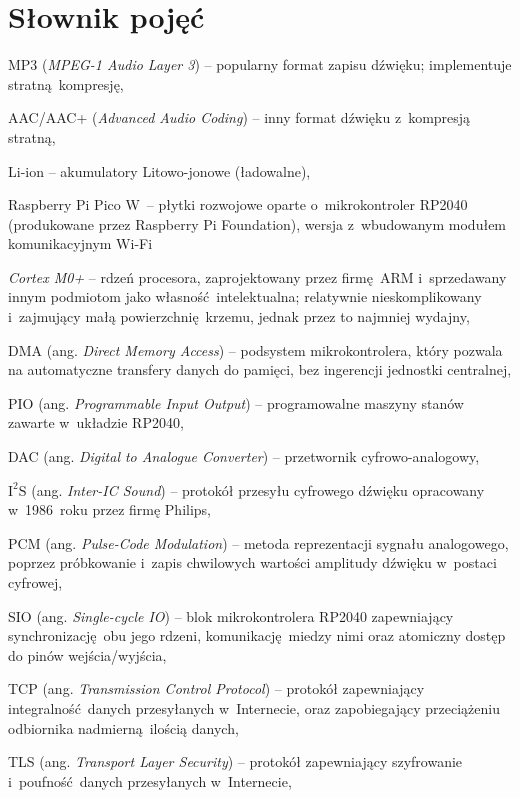 \documentclass[polish]{aghengthesis}
\let\tempone\itemize
\let\temptwo\enditemize
\renewenvironment{itemize}{\tempone\setlength{\itemsep}{0cm}}{\temptwo}
\newcommand{\isqs}{$\text{I}^{2}\text{S}$}
\begin{document}
	\section{Słownik pojęć}
	\begin{itemize}
		\setlength{\itemsep}{0.1cm}
		\item MP3 (\textit{MPEG-1 Audio Layer 3}) -- popularny format zapisu dźwięku; implementuje stratną kompresję,
		\item AAC/AAC+ (\textit{Advanced Audio Coding}) -- inny format dźwięku z~kompresją stratną,
		\item Li-ion -- akumulatory Litowo-jonowe (ładowalne),
		\item Raspberry Pi Pico W~-- płytki rozwojowe oparte o~mikrokontroler RP2040 (produkowane przez Raspberry Pi Foundation), wersja z~wbudowanym modułem komunikacyjnym Wi-Fi
		\item \textit{Cortex M0+} -- rdzeń procesora, zaprojektowany przez firmę ARM i~sprzedawany innym podmiotom jako własność intelektualna; relatywnie nieskomplikowany i~zajmujący małą powierzchnię krzemu, jednak przez to najmniej wydajny,
		\item DMA (ang. \textit{Direct Memory Access}) -- podsystem mikrokontrolera, który pozwala na automatyczne transfery danych do pamięci, bez ingerencji jednostki centralnej,
		\item PIO (ang. \textit{Programmable Input Output}) -- programowalne maszyny stanów zawarte w~układzie RP2040,
		\item DAC (ang. \textit{Digital to Analogue Converter}) -- przetwornik cyfrowo-analogowy,
		\item \isqs{} (ang. \textit{Inter-IC Sound}) -- protokół przesyłu cyfrowego dźwięku opracowany w~1986~roku przez firmę Philips,
		\item PCM (ang. \textit{Pulse-Code Modulation}) -- metoda reprezentacji sygnału analogowego, poprzez próbkowanie i~zapis chwilowych wartości amplitudy dźwięku w~postaci cyfrowej,
		\item SIO (ang. \textit{Single-cycle IO}) -- blok mikrokontrolera RP2040 zapewniający synchronizację obu jego rdzeni, komunikację miedzy nimi oraz atomiczny dostęp do pinów wejścia/wyjścia,
		\item TCP (ang. \textit{Transmission Control Protocol}) -- protokół zapewniający integralność danych przesyłanych w~Internecie, oraz zapobiegający przeciążeniu odbiornika nadmierną ilością danych,
		\item TLS (ang. \textit{Transport Layer Security}) -- protokół zapewniający szyfrowanie i~poufność danych przesyłanych w~Internecie,
	\end{itemize}
\end{document}
